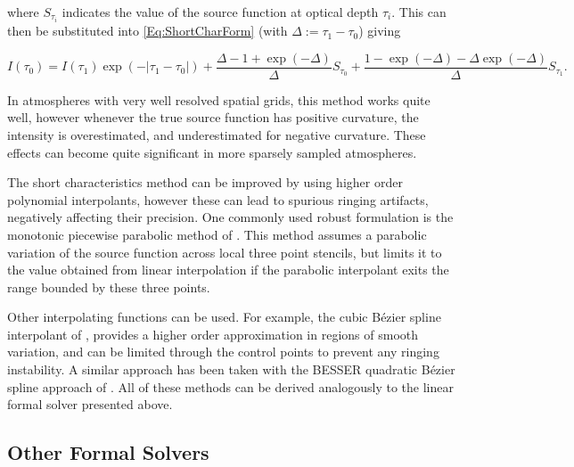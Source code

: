 where $S_{\tau_i}$ indicates the value of the source function at optical depth $\tau_i$.
This can then be substituted into \eqref{Eq:ShortCharForm} (with $\Delta := \tau_1 - \tau_0$) giving

\begin{equation}
    I(\tau_0) = I(\tau_1) \exp(- |\tau_1 - \tau_0|) +
    \frac{\Delta - 1 + \exp(-\Delta)}{\Delta} S_{\tau_0} +
    \frac{1 - \exp(-\Delta) - \Delta\exp(-\Delta)}{\Delta} S_{\tau_1}.
\end{equation}

In atmospheres with very well resolved spatial grids, this method works quite well, however whenever the true source function has positive curvature, the intensity is overestimated, and underestimated for negative curvature. These effects can become quite significant in more sparsely sampled atmospheres.

The short characteristics method can be improved by using higher order polynomial interpolants, however these can lead to spurious ringing artifacts, negatively affecting their precision. One commonly used robust formulation is the monotonic piecewise parabolic method of \citet{Auer1994}. This method assumes a parabolic variation of the source function across local three point stencils, but limits it to the value obtained from linear interpolation if the parabolic interpolant exits the range bounded by these three points.

Other interpolating functions can be used. For example, the cubic Bézier spline interpolant of \citet{DelaCruzRodriguez2013}, provides a higher order approximation in regions of smooth variation, and can be limited through the control points to prevent any ringing instability. A similar approach has been taken with the BESSER quadratic Bézier spline approach of \citet{Stepan2013}.
All of these methods can be derived analogously to the linear formal solver presented above.

\subsection{Other Formal Solvers}


